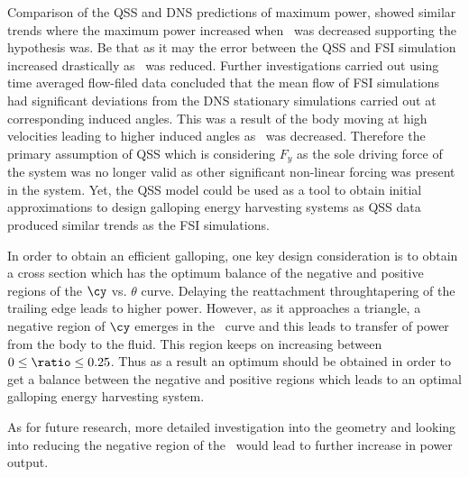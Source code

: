 Comparison of the QSS and DNS predictions of maximum power,  showed similar trends where the maximum power increased when \ratio\ was decreased supporting the hypothesis was. Be that as it may the error between the QSS and FSI simulation increased drastically as \ratio\ was reduced. Further investigations carried out using time averaged flow-filed data concluded that the mean flow of FSI simulations had significant deviations from the DNS stationary simulations carried out at corresponding induced angles. This was a result of the body moving at high velocities leading to higher induced angles as \ratio\ was decreased. Therefore the primary assumption of QSS which is considering $F_y$ as the sole driving force of the system was no longer valid as other significant non-linear forcing was present in the system. Yet, the QSS model could be used as a tool to obtain initial approximations to design galloping energy harvesting systems as QSS data produced similar trends as the FSI simulations.

In order to obtain an efficient galloping, one key design consideration is to obtain a cross section which has the optimum balance of the negative and positive regions of the $\cy$ vs. $\theta$ curve. Delaying the reattachment throughtapering of the trailing edge leads to higher power. However, as it approaches a triangle, a negative region of $\cy$ emerges in the \cy\ curve and this leads to transfer of power from the body to the fluid. This region keeps on increasing between $0\leq\ratio\leq0.25$. Thus as a result an optimum \ratio should be obtained in order to get a balance between the negative and positive regions which leads to an optimal galloping energy harvesting system. 

As for future research, more detailed investigation into the geometry and looking into reducing the negative region of the \cy\ would lead to further increase in power output. 

 

      




